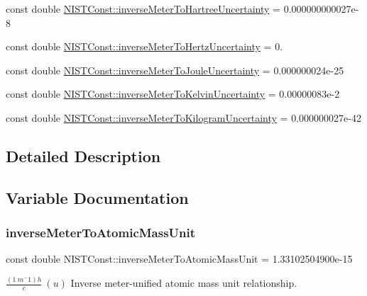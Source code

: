 \begin{DoxyCompactItemize}
const double \hyperlink{group___n_i_s_t_const-_inverse_meter_gac31d4508dcf24c9b18d914aa6f8760a1}{N\+I\+S\+T\+Const\+::inverse\+Meter\+To\+Hartree\+Uncertainty} = 0.\+000000000027e-\/8
\item 
const double \hyperlink{group___n_i_s_t_const-_inverse_meter_ga96ba9736f99affda3bf53cb99bda10b0}{N\+I\+S\+T\+Const\+::inverse\+Meter\+To\+Hertz\+Uncertainty} = 0.
\item 
const double \hyperlink{group___n_i_s_t_const-_inverse_meter_gae5a72bfc7da337d98e1df913d379cf66}{N\+I\+S\+T\+Const\+::inverse\+Meter\+To\+Joule\+Uncertainty} = 0.\+000000024e-\/25
\item 
const double \hyperlink{group___n_i_s_t_const-_inverse_meter_gad0b83065f808c922edc87282db57f184}{N\+I\+S\+T\+Const\+::inverse\+Meter\+To\+Kelvin\+Uncertainty} = 0.\+00000083e-\/2
\item 
const double \hyperlink{group___n_i_s_t_const-_inverse_meter_gaedbe76575234cd5252d6a4b2ef8db104}{N\+I\+S\+T\+Const\+::inverse\+Meter\+To\+Kilogram\+Uncertainty} = 0.\+000000027e-\/42
\end{DoxyCompactItemize}


\subsection{Detailed Description}


\subsection{Variable Documentation}
\mbox{\label{group___n_i_s_t_const-_inverse_meter_ga7d76b1c26bd9b6226d0bdbcbfe44c3a0}} 
\subsubsection{\texorpdfstring{inverse\+Meter\+To\+Atomic\+Mass\+Unit}{inverseMeterToAtomicMassUnit}}
{\footnotesize\ttfamily const double N\+I\+S\+T\+Const\+::inverse\+Meter\+To\+Atomic\+Mass\+Unit = 1.\+33102504900e-\/15}

$\frac{(1\ m^-1)h}{c} \ (u)$ Inverse meter-\/unified atomic mass unit relationship. \mbox{\label{group___n_i_s_t_const-_inverse_meter_ga19f65e8c675ab4bbf77f2d7fcc27dec8}} 
